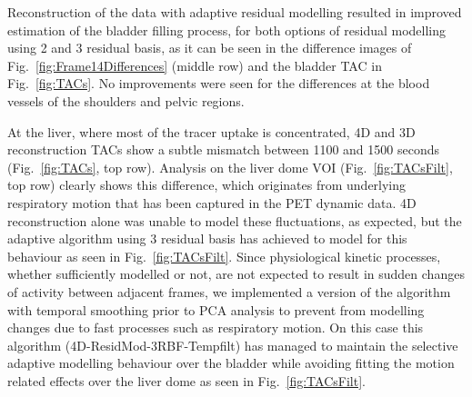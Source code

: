 Reconstruction of the data with adaptive residual modelling resulted in improved estimation of the bladder filling process, for both options of residual modelling using 2 and 3 residual basis, as it can be seen in the difference images of Fig.~\ref{fig:Frame14Differences} (middle row) and the bladder TAC in Fig.~\ref{fig:TACs}. 
No improvements were seen for the differences at the blood vessels of the shoulders and pelvic regions. 

At the liver, where most of the tracer uptake is concentrated, 4D and 3D reconstruction TACs show a subtle mismatch between 1100 and 1500 seconds (Fig.~\ref{fig:TACs}, top row). Analysis on the liver dome VOI (Fig.~\ref{fig:TACsFilt}, top row) clearly shows this difference, which originates from underlying respiratory motion that has been captured in the PET dynamic data. 4D reconstruction alone was unable to model these fluctuations, as expected, but the adaptive algorithm using 3 residual basis has achieved to model for this behaviour as seen in Fig.~\ref{fig:TACsFilt}.
Since physiological kinetic processes, whether sufficiently modelled or not, are not expected to result in sudden changes of activity between adjacent frames, we implemented a version of the algorithm with temporal smoothing prior to PCA analysis to prevent from modelling changes due to fast processes such as respiratory motion. On this case this algorithm (4D-ResidMod-3RBF-Tempfilt) has managed to maintain the selective adaptive modelling behaviour over the bladder while avoiding fitting the motion related effects over the liver dome as seen in Fig.~\ref{fig:TACsFilt}. 

